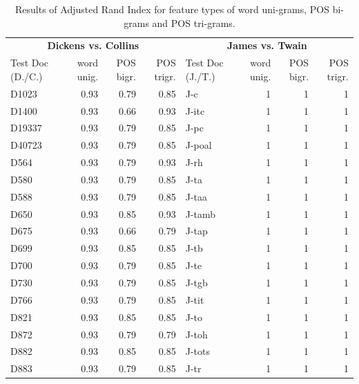 \documentclass[a4paper,10pt,twoside,fleqn]{article}
\begin{document}
\begin{table}[h!]
\small

\caption{Results of Adjusted Rand Index for feature types of word uni-grams, POS bi-grams and POS tri-grams.}
\label{tab:results-clust}
 \begin{tabular}{lrrrlrrr} \toprule[1.2pt]
  \multicolumn{4}{c}{\textbf{Dickens vs. Collins}} & \multicolumn{4}{c}{\textbf{James vs. Twain}} \\
   \cmidrule(r){1-4}
    \cmidrule(r){5-8}
Test Doc (D./C.) & word unig. & POS bigr. & POS trigr. & Test Doc (J./T.) & word unig. & POS bigr. & POS trigr.\\ \midrule
D1023    & 0.93 & 0.79 & 0.85 &        J-c    &    1    &    1    &    1   \\
D1400    & 0.93 & 0.66 & 0.93 &      J-itc    &    1    &    1    &    1   \\
D19337   & 0.93 & 0.79 & 0.85 &       J-pc    &    1    &    1    &    1   \\
D40723   & 0.93 & 0.79 & 0.85 &     J-poal    &    1    &    1    &    1   \\
D564     & 0.93 & 0.79 & 0.93 &       J-rh    &    1    &    1    &    1   \\
D580     & 0.93 & 0.79 & 0.85 &       J-ta    &    1    &    1    &    1   \\
D588     & 0.93 & 0.79 & 0.85 &      J-taa    &    1    &    1    &    1   \\
D650     & 0.93 & 0.85 & 0.93 &     J-tamb    &    1    &    1    &    1   \\
D675     & 0.93 & 0.66 & 0.79 &      J-tap    &    1    &    1    &    1   \\
D699     & 0.93 & 0.85 & 0.85 &       J-tb    &    1    &    1    &    1   \\
D700     & 0.93 & 0.79 & 0.85 &       J-te    &    1    &    1    &    1   \\
D730     & 0.93 & 0.79 & 0.85 &      J-tgb    &    1    &    1    &    1   \\
D766     & 0.93 & 0.79 & 0.85 &      J-tit    &    1    &    1    &    1   \\
D821     & 0.93 & 0.85 & 0.85 &       J-to    &    1    &    1    &    1   \\
D872     & 0.93 & 0.79 & 0.79 &      J-toh    &    1    &    1    &    1   \\
D882     & 0.93 & 0.85 & 0.85 &     J-tots    &    1    &    1    &    1   \\
D883     & 0.93 & 0.79 & 0.85 &       J-tr    &    1    &    1    &    1   \\

\end{tabular}
\end{table}
\end{document}
